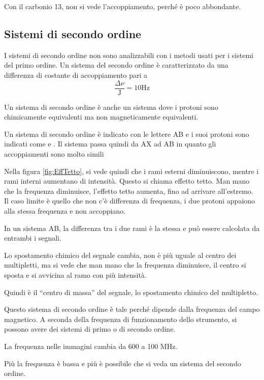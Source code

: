 Con il carbonio 13, non si vede l'accoppiamento, perché è poco
abbondante.

\subsection{Sistemi di secondo ordine}

I sistemi di secondo ordine non sono analizzabili con i metodi usati per i sistemi del primo ordine. Un sistema del secondo ordine è caratterizzato da una differenza di costante di accoppiamento pari a \[ \frac{\Delta \nu}{\text{J}} = 10 \text{Hz} \]

Un sistema di secondo ordine è anche un sistema dove i protoni sono chimicamente equivalenti ma non magneticamente equivalenti.


Un sistema di secondo ordine è indicato con le lettere AB e i suoi protoni sono indicati come  e . Il sistema passa quindi da AX ad AB in quanto gli accoppiamenti sono molto simili


Nella figura \ref{fig:EffTetto}, si vede quindi che i rami esterni diminuiscono, mentre i rami
interni aumentano di intensità. Questo si chiama effetto tetto.
Man mano che la frequenza diminuisce, l'effetto tetto aumenta, fino ad
arrivare all'estremo.
Il caso limite è quello che non c'è differenza di frequenza, i due
protoni appaiono alla stessa frequenza e non accoppiano.

In un sistema AB, la differenza tra i due rami è la stessa e può essere
calcolata da entrambi i segnali.

Lo spostamento chimico del segnale cambia, non è più uguale al centro
dei multipletti, ma si vede che man mano che la frequenza diminuisce, il
centro si sposta e si avvicina al ramo con più intensità.

Quindi è il ``centro di massa'' del segnale, lo spostamento chimico del
multipletto.

Questo sistema di secondo ordine è tale perché dipende dalla frequenza
del campo magnetico. A seconda della frequenza di funzionamento dello
strumento, si possono avere dei sistemi di primo o di secondo ordine.

La frequenza nelle immagini cambia da 600 a 100 MHz.

Più la frequenza è bassa e più è possibile che si veda un sistema del
secondo ordine.

